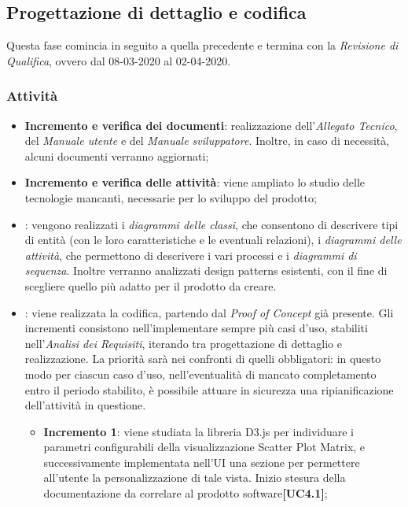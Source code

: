 \subsection{Progettazione di dettaglio e codifica}
Questa fase comincia in seguito a quella precedente e termina con la \textit{Revisione di Qualifica}, ovvero dal 08-03-2020 al 02-04-2020.

\subsubsection{Attività}
\begin{itemize}
	\item \textbf{Incremento e verifica dei documenti}: realizzazione dell'\textit{Allegato Tecnico}, del \textit{Manuale utente} e del \textit{Manuale sviluppatore}. Inoltre, in caso di necessità, alcuni documenti verranno aggiornati;
	\item \textbf{Incremento e verifica delle attività}: viene ampliato lo studio delle tecnologie mancanti, necessarie per lo sviluppo del prodotto; 
	\item \textbf{}: vengono realizzati i \textit{diagrammi delle classi}, che consentono di descrivere tipi di entità (con le loro caratteristiche e le eventuali relazioni), i \textit{diagrammi delle attività}, che permettono di descrivere i vari processi e i \textit{diagrammi di sequenza}. Inoltre verranno analizzati design patterns esistenti, con il fine di scegliere quello più adatto per il prodotto da creare.
	\item \textbf{}: viene realizzata la codifica, partendo dal \textit{Proof of Concept} già presente. Gli incrementi consistono nell'implementare sempre più casi d'uso, stabiliti nell'\textit{Analisi dei Requisiti}, iterando tra progettazione di dettaglio e realizzazione. La priorità sarà nei confronti di quelli obbligatori: in questo modo per ciascun caso d'uso, nell'eventualità di mancato completamento entro il periodo stabilito, è possibile attuare in sicurezza una ripianificazione dell'attività in questione.
	\begin{itemize}
	\item \textbf{Incremento 1}: viene studiata la libreria D3.js per individuare i parametri configurabili della visualizzazione Scatter Plot Matrix, e successivamente implementata nell'UI una sezione per permettere all'utente la personalizzazione di tale vista. Inizio stesura della documentazione da correlare al prodotto software\textbf{[UC4.1]};
	

\end{itemize}
\end{itemize}
